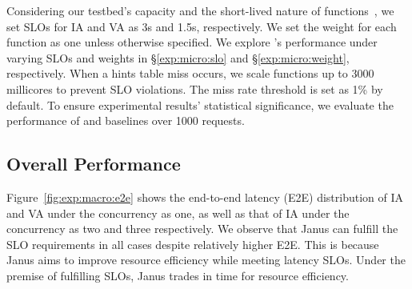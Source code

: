 


Considering our testbed's capacity and the short-lived nature of functions~\cite{atc20-serverless-in-the-wild,socc23-huawei-cloud}, we set SLOs for IA and VA as 3s and 1.5s, respectively.
We set the weight for each function as one unless otherwise specified.
We explore \namex's performance under varying SLOs and weights in \S\ref{exp:micro:slo} and \S\ref{exp:micro:weight}, respectively.
When a hints table miss occurs, we scale functions up to 3000 millicores to prevent SLO violations.
The miss rate threshold is set as 1\% by default.
To ensure experimental results' statistical significance, we evaluate the performance of \namex and baselines over 1000 requests. 


\subsection{Overall Performance}
\label{exp:macro}
Figure~\ref{fig:exp:macro:e2e} shows the end-to-end latency (E2E) distribution of IA and VA under the concurrency as one, as well as that of IA under the concurrency as two and three respectively.
We observe that Janus can fulfill the SLO requirements in all cases despite relatively higher E2E.
This is because Janus aims to improve resource efficiency while meeting latency SLOs. 
Under the premise of fulfilling SLOs, Janus trades in time for resource efficiency.

